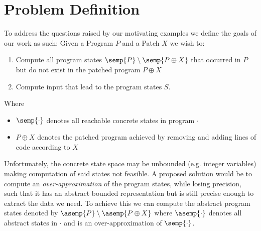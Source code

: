 \section{Problem Definition}\label{Sec:ProblemDef}
To address the questions raised by our motivating examples we define the
goals of our work as such: Given a Program $P$ and a Patch $X$ we wish to:
\begin{enumerate}
\item Compute all program states $\semp{P} \setminus \semp{P\oplus X}$ that occurred in $P$ but do not
    exist in the patched program $P\oplus X$
\item Compute input that lead to the program states $S$.
\end{enumerate}
Where
\begin{itemize}
\item $\semp{\cdot}$ denotes all reachable concrete states in program $\cdot$
\item $P\oplus X$ denotes the patched program achieved by removing and
    adding lines of code according to $X$
\end{itemize}

Unfortunately, the concrete state space may be unbounded (e.g. integer
variables) making computation of said states not feasible. A proposed
solution would be to compute an \emph{over-approximation} of the program
states, while losing precision, such that it has an abstract bounded
representation but is still precise enough to extract the data we need. To
achieve this we can compute the abstract program states denoted by
$\asemp{P}\setminus \asemp{P\oplus X}$ where $\asemp{\cdot}$ denotes all
abstract states in $\cdot$ and is an over-approximation of $\semp{\cdot}$.
